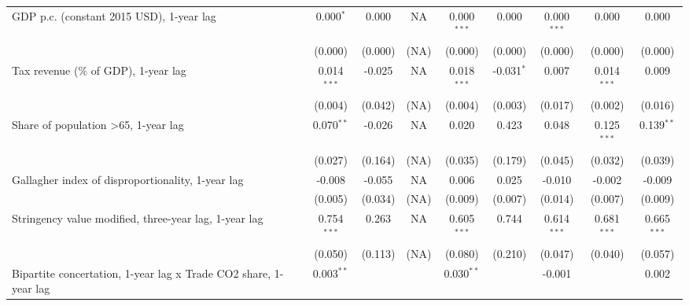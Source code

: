 \begin{table}[htbp]
\begin{tabular}{lcccccccc}
      GDP p.c. (constant 2015 USD), 1-year lag                         & 0.000$^{*}$   & 0.000                     & NA           & 0.000$^{***}$  & 0.000            & 0.000$^{***}$   & 0.000           & 0.000\\   
                                                                       & (0.000)       & (0.000)                   & (NA)         & (0.000)        & (0.000)          & (0.000)         & (0.000)         & (0.000)\\   
      Tax revenue (\% of GDP), 1-year lag                              & 0.014$^{***}$ & -0.025                    & NA           & 0.018$^{***}$  & -0.031$^{*}$     & 0.007           & 0.014$^{***}$   & 0.009\\   
                                                                       & (0.004)       & (0.042)                   & (NA)         & (0.004)        & (0.003)          & (0.017)         & (0.002)         & (0.016)\\   
      Share of population >65, 1-year lag                              & 0.070$^{**}$  & -0.026                    & NA           & 0.020          & 0.423            & 0.048           & 0.125$^{***}$   & 0.139$^{**}$\\   
                                                                       & (0.027)       & (0.164)                   & (NA)         & (0.035)        & (0.179)          & (0.045)         & (0.032)         & (0.039)\\   
      Gallagher index of disproportionality, 1-year lag                & -0.008        & -0.055                    & NA           & 0.006          & 0.025            & -0.010          & -0.002          & -0.009\\   
                                                                       & (0.005)       & (0.034)                   & (NA)         & (0.009)        & (0.007)          & (0.014)         & (0.007)         & (0.009)\\   
      Stringency value modified, three-year lag, 1-year lag            & 0.754$^{***}$ & 0.263                     & NA           & 0.605$^{***}$  & 0.744            & 0.614$^{***}$   & 0.681$^{***}$   & 0.665$^{***}$\\   
                                                                       & (0.050)       & (0.113)                   & (NA)         & (0.080)        & (0.210)          & (0.047)         & (0.040)         & (0.057)\\   
      Bipartite concertation, 1-year lag x Trade CO2 share, 1-year lag & 0.003$^{**}$  &                           &              & 0.030$^{**}$   &                  & -0.001          &                 & 0.002\\   

\end{tabular}
\end{table}
